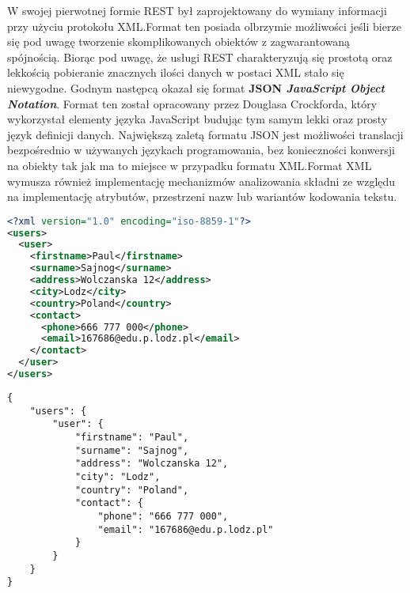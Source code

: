 W swojej pierwotnej formie REST był zaprojektowany do wymiany informacji przy użyciu protokołu XML.\@ Format ten posiada olbrzymie możliwości jeśli bierze się pod uwagę tworzenie skomplikowanych obiektów z zagwarantowaną spójnością. Biorąc pod uwagę, że usługi REST charakteryzują się prostotą oraz lekkością pobieranie znacznych ilości danych w postaci XML stało się niewygodne. Godnym następcą okazał się format \textbf{JSON \textit{JavaScript Object Notation}}. Format ten został opracowany przez Douglasa Crockforda, który wykorzystał elementy języka JavaScript budując tym samym lekki oraz prosty język definicji danych. Największą zaletą formatu JSON jest możliwości translacji bezpośrednio w używanych językach programowania, bez konieczności konwersji na obiekty tak jak ma to miejsce w przypadku formatu XML.\@ Format XML wymusza również implementację mechanizmów analizowania składni ze względu na implementację atrybutów, przestrzeni nazw lub wariantów kodowania tekstu.
\begin{lstlisting}[language=xml, caption=Dane zapisane w formacie XML]
<?xml version="1.0" encoding="iso-8859-1"?>
<users>
  <user>
    <firstname>Paul</firstname>
    <surname>Sajnog</surname>
    <address>Wolczanska 12</address>
    <city>Lodz</city>
    <country>Poland</country>
    <contact>
      <phone>666 777 000</phone>
      <email>167686@edu.p.lodz.pl</email>
    </contact>
  </user>
</users>
\end{lstlisting}
\newpage
\begin{lstlisting}[caption=Dane zapisane w formacie JSON]
{
    "users": {
        "user": {
            "firstname": "Paul",
            "surname": "Sajnog",
            "address": "Wolczanska 12",
            "city": "Lodz",
            "country": "Poland",
            "contact": {
                "phone": "666 777 000",
                "email": "167686@edu.p.lodz.pl"
            }
        }
    }
}
    \end{lstlisting}
